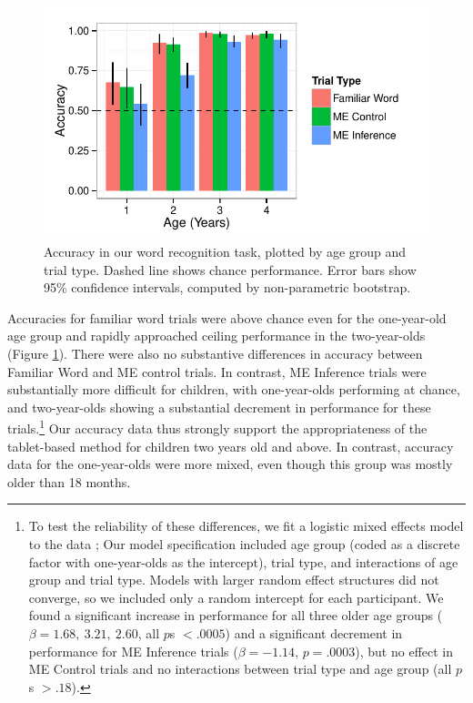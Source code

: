 \documentclass[man,noapacite]{apa2}
\begin{document}
\begin{figure}[t] 
  \begin{center} 
    \includegraphics[width=5in]{figures/accuracy.pdf} 
    \caption{\label{fig:accuracy} Accuracy in our word recognition task, plotted by age group and trial type. Dashed line shows chance performance. Error bars show 95\% confidence intervals, computed by non-parametric bootstrap. }
  \end{center} 
\end{figure}

Accuracies for familiar word trials were above chance even for the one-year-old age group and rapidly approached ceiling performance in the two-year-olds (Figure \ref{fig:accuracy}). There were also no substantive differences in accuracy between Familiar Word and ME control trials. In contrast, ME Inference trials were substantially more difficult for children, with one-year-olds performing at chance, and two-year-olds showing a substantial decrement in performance for these trials.\footnote{To test the reliability of these differences, we fit a logistic mixed effects model to the data \cite{jaeger2008}; Our model specification included age group (coded as a discrete factor with one-year-olds as the intercept), trial type, and interactions of age group and trial type. Models with larger random effect structures did not converge, so we included only a random intercept for each participant. We found a significant increase in performance for all three older age groups ($\beta = 1.68,~3.21,~2.60$, all $p$s $< .0005$) and a significant decrement in performance for ME Inference trials  ($\beta = -1.14$, $p = .0003$), but no effect in ME Control trials and no interactions between trial type and age group (all $p$s $> .18$). 
} 
Our accuracy data thus strongly support the appropriateness of the tablet-based method for children two years old and above. In contrast, accuracy data for the one-year-olds were more mixed, even though this group was mostly older than 18 months. 
\end{document}
